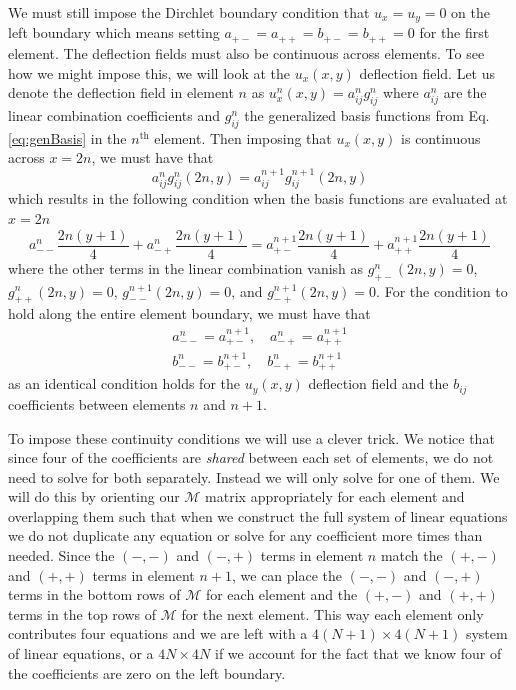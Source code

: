 \documentclass[11pt]{article}
\begin{document}
We must still impose the Dirchlet boundary condition that $u_x=u_y=0$ on the left boundary which means setting $a_{+-} = a_{++} = b_{+-} = b_{++} = 0$ for the first element. The deflection fields must also be continuous across elements. To see how we might impose this, we will look at the $u_x(x,y)$ deflection field. Let us denote the deflection field in element $n$ as $u^n_x(x,y) = a^n_{ij} g^n_{ij}$ where $a^n_{ij}$ are the linear combination coefficients and $g^n_{ij}$ the generalized basis functions from Eq. \eqref{eq:genBasis} in the $n^\mathrm{th}$ element. Then imposing that $u_x(x,y)$ is continuous across $x=2n$, we must have that
\begin{equation}
	a^n_{ij} g^n_{ij}(2n,y) = a^{n+1}_{ij} g^{n+1}_{ij}(2n,y)
\end{equation}
which results in the following condition when the basis functions are evaluated at $x=2n$
\begin{equation}
	a^n_{--} \frac{2n(y+1)}{4} + a^n_{-+} \frac{2n(y+1)}{4} = a^{n+1}_{+-} \frac{2n(y+1)}{4} + a^{n+1}_{++} \frac{2n(y+1)}{4}
\end{equation}
where the other terms in the linear combination vanish as $g^n_{+-}(2n,y) = 0$, $g^n_{++}(2n,y) = 0$, $g^{n+1}_{--}(2n,y) = 0$, and $g^{n+1}_{-+}(2n,y) = 0$. For the condition to hold along the entire element boundary, we must have that
\begin{equation}
\begin{gathered}
	a^n_{--} = a^{n+1}_{+-}, \quad a^n_{-+} = a^{n+1}_{++} \\
	b^n_{--} = b^{n+1}_{+-}, \quad b^n_{-+} = b^{n+1}_{++}
\end{gathered}
\end{equation}
as an identical condition holds for the $u_y(x,y)$ deflection field and the $b_{ij}$ coefficients between elements $n$ and $n+1$.

To impose these continuity conditions we will use a clever trick. We notice that since four of the coefficients are \emph{shared} between each set of elements, we do not need to solve for both separately. Instead we will only solve for one of them. We will do this by orienting our $\mathcal{M}$ matrix appropriately for each element and overlapping them such that when we construct the full system of linear equations we do not duplicate any equation or solve for any coefficient more times than needed. Since the $(-,-)$ and $(-,+)$ terms in element $n$ match the $(+,-)$ and $(+,+)$ terms in element $n+1$, we can place the $(-,-)$ and $(-,+)$ terms in the bottom rows of $\mathcal{M}$ for each element and the $(+,-)$ and $(+,+)$ terms in the top rows of $\mathcal{M}$ for the next element. This way each element only contributes four equations and we are left with a $4(N+1)\times4(N+1)$ system of linear equations, or a $4N\times4N$ if we account for the fact that we know four of the coefficients are zero on the left boundary.
\end{document}
